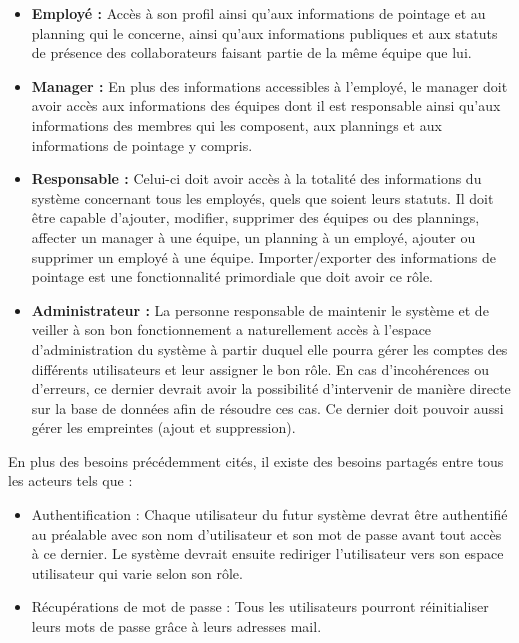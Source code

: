 \begin{itemize}
    \item [\textbullet] \textbf{Employé :} Accès à son profil ainsi qu’aux
        informations de pointage et au planning qui le concerne, ainsi qu’aux
        informations publiques et aux statuts de présence des collaborateurs
        faisant partie de la même équipe que lui.
        
    \item [\textbullet] \textbf{Manager :} En plus des informations accessibles
        à l’employé, le manager doit avoir accès aux informations des équipes
        dont il est responsable ainsi qu’aux informations des membres qui les
        composent, aux plannings et aux informations de pointage y compris.

    \item [\textbullet] \textbf{Responsable :} Celui-ci doit avoir accès à la
        totalité des informations du système concernant tous les employés, quels
        que soient leurs statuts. Il doit être capable d’ajouter, modifier,
        supprimer des équipes ou des plannings, affecter un manager à une
        équipe, un planning à un employé, ajouter ou supprimer un employé à
        une équipe. Importer/exporter des informations de pointage est une
        fonctionnalité primordiale que doit avoir ce rôle.
        
    \item [\textbullet] \textbf{Administrateur :} La personne responsable de
        maintenir le système et de veiller à son bon fonctionnement a
        naturellement accès à l’espace d’administration du système à partir
        duquel elle pourra gérer les comptes des différents utilisateurs et leur
        assigner le bon rôle. En cas d’incohérences ou d’erreurs, ce dernier
        devrait avoir la possibilité d’intervenir de manière directe sur la base
        de données afin de résoudre ces cas. Ce dernier doit pouvoir aussi gérer
        les empreintes (ajout et suppression).
\end{itemize}

En plus des besoins précédemment cités, il existe des besoins partagés entre
tous les acteurs tels que :

\begin{itemize}
    \item [\textbullet] Authentification : Chaque utilisateur du futur système
        devrat être authentifié au préalable avec son nom d’utilisateur et son
        mot de passe avant tout accès à ce dernier. Le système devrait ensuite
        rediriger l’utilisateur vers son espace utilisateur qui varie selon son
        rôle.

    \item [\textbullet] Récupérations de mot de passe : Tous les utilisateurs
        pourront réinitialiser leurs mots de passe grâce à leurs adresses mail.
\end{itemize}
            
